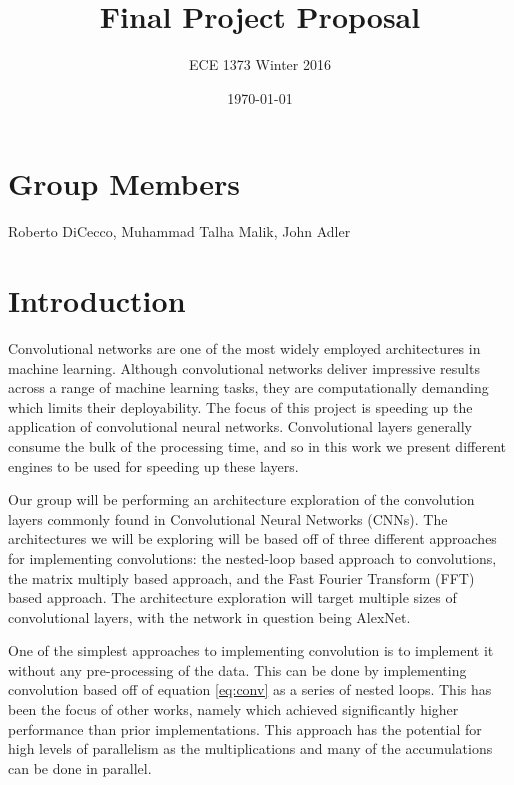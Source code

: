\documentclass[conference,compsoc]{IEEEtran/IEEEtran}
\title{\bf Final Project Proposal}
\author{ECE 1373 Winter 2016}
\date{\today}
\begin{document}
\maketitle

\section{Group Members}
Roberto DiCecco, Muhammad Talha Malik, John Adler

\section{Introduction}\label{section:intro}

Convolutional networks are one of the most widely employed architectures in machine learning. Although convolutional networks deliver impressive results across a range of machine learning tasks, they are computationally demanding which limits their deployability. The focus of this project is speeding up the application of convolutional neural networks. Convolutional layers generally consume the bulk of the processing time, and so in this work we present different engines to be used for speeding up these layers.

Our group will be performing an architecture exploration of the convolution layers commonly found in 
Convolutional Neural Networks (CNNs). The architectures we will be exploring will be based off of three
different approaches for implementing convolutions: the nested-loop based approach to convolutions, 
the matrix multiply based approach, and the Fast Fourier Transform (FFT) based approach. The architecture
exploration will target multiple sizes of convolutional layers, with the network in question being AlexNet. 

One of the simplest approaches to implementing convolution is to implement it without any pre-processing of the data.
This can be done by implementing convolution based off of equation \ref{eq:conv} as a series of nested loops. This has been
the focus of other works, namely \cite{conv_zhang} which achieved significantly higher performance than prior implementations. 
This approach has the potential for high levels of parallelism as the multiplications and many of the accumulations can be done
in parallel. 
\end{document}
